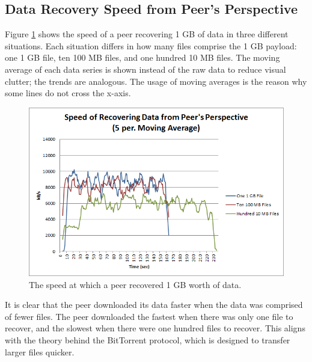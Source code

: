 \documentclass[12pt]{report}
\begin{document}
\subsection{Data Recovery Speed from Peer's Perspective} \label{subsec:DataRecoverySpeedfromPeersPerspective}

Figure \ref{fig:PeerRecoverySpeed} shows the speed of a peer recovering 1 GB of data in three different situations. Each situation differs in how many files comprise the 1 GB payload: one 1 GB file, ten 100 MB files, and one hundred 10 MB files. The moving average of each data series is shown instead of the raw data to reduce visual clutter; the trends are analogous. The usage of moving averages is the reason why some lines do not cross the x-axis.

\begin{figure}
  \centerline{\includegraphics[scale=1]{figures/PeerRecoverySpeed}}
  \caption{The speed at which a peer recovered 1 GB worth of data. \label{fig:PeerRecoverySpeed}}
\end{figure}

It is clear that the peer downloaded its data faster when the data was comprised of fewer files. The peer downloaded the fastest when there was only one file to recover, and the slowest when there were one hundred files to recover. This aligns with the theory behind the BitTorrent protocol, which is designed to transfer larger files quicker.
\end{document}
